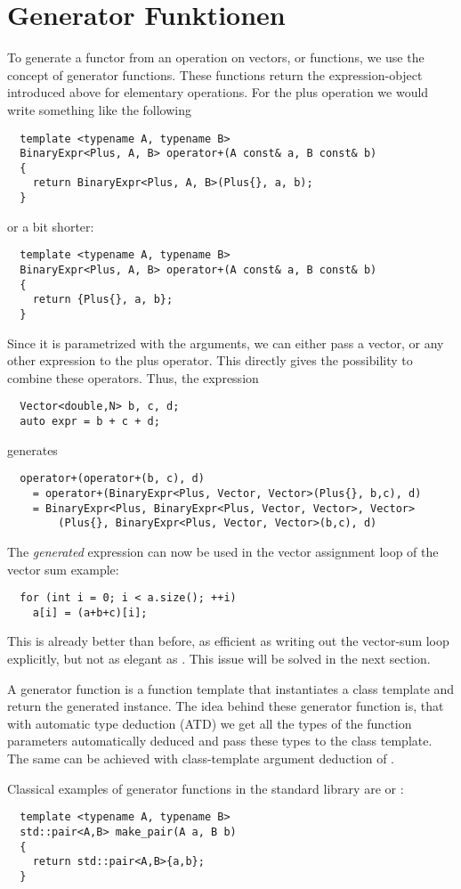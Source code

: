 \section{Generator Funktionen}
To generate a functor from an operation on vectors, or functions, we use the concept of generator functions. These functions return
the expression-object introduced above for elementary operations. For the plus operation we would write something like the following
%
\begin{verbatim}
  template <typename A, typename B>
  BinaryExpr<Plus, A, B> operator+(A const& a, B const& b)
  {
    return BinaryExpr<Plus, A, B>(Plus{}, a, b);
  }
\end{verbatim}
%
or a bit shorter:
%
\begin{verbatim}
  template <typename A, typename B>
  BinaryExpr<Plus, A, B> operator+(A const& a, B const& b)
  {
    return {Plus{}, a, b};
  }
\end{verbatim}

Since it is parametrized with the arguments, we can either pass a vector, or any other expression to the plus operator. This directly gives
the possibility to combine these operators. Thus, the expression
%
\begin{verbatim}
  Vector<double,N> b, c, d;
  auto expr = b + c + d;
\end{verbatim}
%
generates
%
\begin{verbatim}
  operator+(operator+(b, c), d)
    = operator+(BinaryExpr<Plus, Vector, Vector>(Plus{}, b,c), d)
    = BinaryExpr<Plus, BinaryExpr<Plus, Vector, Vector>, Vector>
        (Plus{}, BinaryExpr<Plus, Vector, Vector>(b,c), d)
\end{verbatim}

\begin{example}
  The \textit{generated} expression can now be used in the vector assignment loop of the vector sum example:
  \begin{verbatim}
  for (int i = 0; i < a.size(); ++i)
    a[i] = (a+b+c)[i];
  \end{verbatim}

  This is already better than before, as efficient as writing out the vector-sum loop explicitly, but not as
  elegant as . This issue will be solved in the next section.
\end{example}

\begin{rem}
  A generator function is a function template that instantiates a class template and return the generated instance.
  The idea behind these generator function is, that with automatic type deduction (ATD) we get all the types of the
  function parameters automatically deduced and pass these types to the class template. The same can be achieved with
  class-template argument deduction of .

  Classical examples of generator functions in the standard library are  or :
  \begin{verbatim}
  template <typename A, typename B>
  std::pair<A,B> make_pair(A a, B b)
  {
    return std::pair<A,B>{a,b};
  }
  \end{verbatim}
\end{rem}

